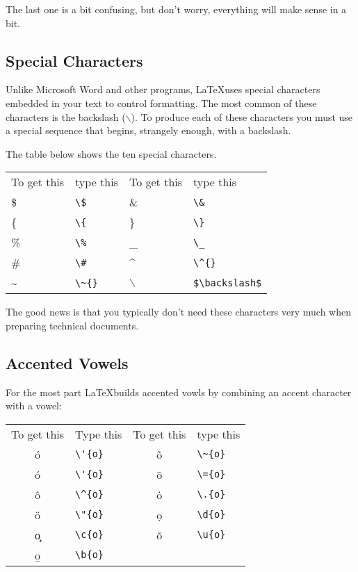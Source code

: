 \begin{enumerate}
The last one is a bit confusing, but don't worry, everything will make
sense in a bit.

\subsection{Special Characters}

Unlike Microsoft Word and other programs, \LaTeX uses special
characters embedded in your text to control formatting. The most
common of these characters is the backslash ($\backslash$). To produce
each of these characters you must use a special sequence that begins,
strangely enough, with a backslash.

The table below shows the ten special characters.

\begin{tabular}{ll|ll}
To get this & type this & To get this & type this \\
\$ & \verb+\$+ & \& & \verb+\&+ \\
\{ & \verb+\{+ & \} & \verb+\}+ \\
\% & \verb+\%+ & \_ & \verb+\_+ \\
\# & \verb+\#+ & \^{} & \verb+\^{}+ \\
\~{} & \verb+\~{}+ & $\backslash$ & \verb+$\backslash$+ \\
\end{tabular}

The good news is that you typically don't need these characters very
much when preparing technical documents.

\subsection{Accented Vowels}
For the most part \LaTeX builds accented vowls by combining an accent character with a
vowel:

\begin{tabular}{cl|cl}
To get this & Type this & To get this & type this\\ 
\'{o} & \verb+\'{o}+ & \~{o} & \verb+\~{o}+ \\
\'{o} & \verb+\'{o}+ & \={o} & \verb+\={o}+ \\
\^{o} & \verb+\^{o}+ & \.{o} & \verb+\.{o}+ \\
\"{o} & \verb+\"{o}+ & \d{o} & \verb+\d{o}+ \\
\c{o} & \verb+\c{o}+ & \u{o} & \verb+\u{o}+ \\
\b{o} & \verb+\b{o}+ \\
\end{tabular}



\end{enumerate}
